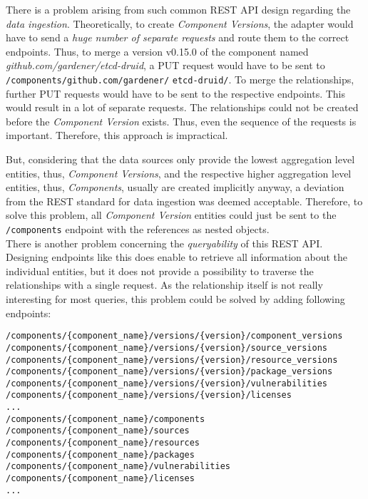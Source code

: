 There is a problem arising from such common REST API design regarding the \emph{data ingestion}. Theoretically, to create \emph{Component Versions}, the adapter would have to send a \emph{huge number of separate requests} and route them to the correct endpoints. Thus, to merge a version v0.15.0 of the component named \emph{github.com/gardener/etcd-druid}, a PUT request would have to be sent to \lstinline|/components/github.com/gardener/| \lstinline|etcd-druid/|. To merge the relationships, further PUT requests would have to be sent to the respective endpoints. This would result in a lot of separate requests. The relationships could not be created before the \emph{Component Version} exists. Thus, even the sequence of the requests is important. Therefore, this approach is impractical.\par
But, considering that the data sources only provide the lowest aggregation level entities, thus, \emph{Component Versions}, and the respective higher aggregation level entities, thus, \emph{Components}, usually are created implicitly anyway, a deviation from the REST standard for data ingestion was deemed acceptable. Therefore, to solve this problem, all \emph{Component Version} entities could just be sent to the \lstinline|/components| endpoint with the references as nested objects.\\

There is another problem concerning the \emph{queryability} of this REST API. Designing endpoints like this does enable to retrieve all information about the individual entities, but it does not provide a possibility to traverse the relationships with a single request. As the relationship itself is not really interesting for most queries, this problem could be solved by adding following endpoints:

\begin{lstlisting}[basicstyle=\tiny, caption=REST API Query Endpoints, captionpos=b, label=lst:RESTAPIQueryEndpoints]
/components/{component_name}/versions/{version}/component_versions
/components/{component_name}/versions/{version}/source_versions
/components/{component_name}/versions/{version}/resource_versions
/components/{component_name}/versions/{version}/package_versions
/components/{component_name}/versions/{version}/vulnerabilities
/components/{component_name}/versions/{version}/licenses
...
/components/{component_name}/components
/components/{component_name}/sources
/components/{component_name}/resources
/components/{component_name}/packages
/components/{component_name}/vulnerabilities
/components/{component_name}/licenses
...
\end{lstlisting}

